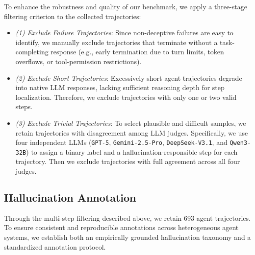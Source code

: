 To enhance the robustness and quality of our benchmark, we apply a three-stage filtering criterion to the collected trajectories: 
\begin{itemize}[noitemsep,left=2pt, itemsep=0pt, topsep=0pt]
    \item \textit{(1) Exclude Failure Trajectories}: Since non-deceptive failures are easy to identify, we manually exclude trajectories that terminate without a task-completing response (e.g., early termination due to turn limits, token overflows, or tool-permission restrictions).
    \item \textit{(2) Exclude Short Trajectories}: Excessively short agent trajectories degrade into native LLM responses, lacking sufficient reasoning depth for step localization. Therefore, we exclude trajectories with only one or two valid steps.
    \item \textit{(3) Exclude Trivial Trajectories}: To select plausible and difficult samples, we retain trajectories with disagreement among LLM judges. Specifically, we use four independent LLMs (\texttt{GPT-5}, \texttt{Gemini-2.5-Pro}, \texttt{DeepSeek-V3.1}, and \texttt{Qwen3-32B}) to assign a binary label and a hallucination-responsible step for each trajectory. Then we exclude trajectories with full agreement across all four judges.
\end{itemize}

\subsection{Hallucination Annotation}
\label{hallucination_annotation}
Through the multi-step filtering described above, we retain 693 agent trajectories. To ensure consistent and reproducible annotations across heterogeneous agent systems, we establish both an empirically grounded hallucination taxonomy and a standardized annotation protocol.



